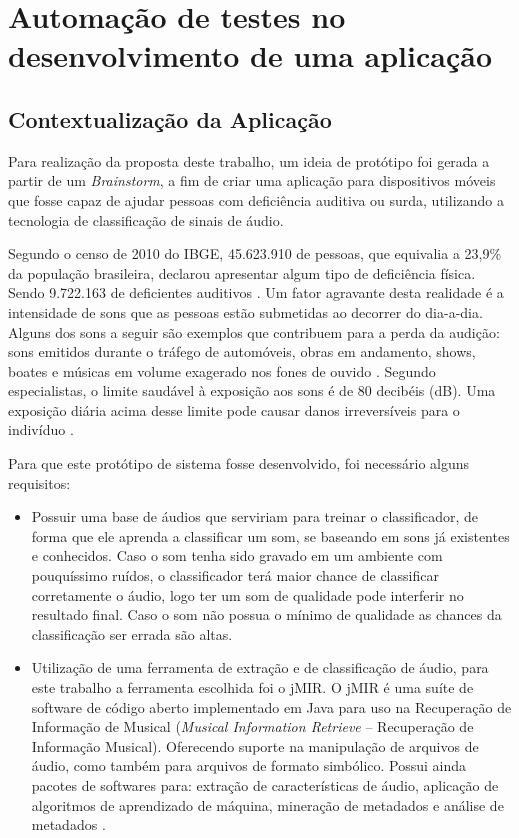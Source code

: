 \chapter{Automação de testes no desenvolvimento de uma aplicação}

\section{Contextualização da Aplicação}
Para realização da proposta deste trabalho, um ideia de protótipo foi gerada a partir de um \textit{Brainstorm}, a fim de criar uma aplicação para dispositivos móveis que fosse capaz de ajudar pessoas com deficiência auditiva ou surda, utilizando a tecnologia de classificação de sinais de áudio.

Segundo  o censo de 2010 do IBGE, 45.623.910 de pessoas, que equivalia a 23,9\% da população brasileira, declarou apresentar algum tipo de deficiência física. Sendo 9.722.163 de deficientes auditivos \cite{censo2010}. Um fator agravante desta realidade é a intensidade de sons que as pessoas estão submetidas ao decorrer do dia-a-dia. Alguns dos sons a seguir são exemplos que contribuem para a perda da audição: sons emitidos durante o tráfego de automóveis, obras em andamento, shows, boates e músicas em volume exagerado nos fones de ouvido \cite{jornalDiaDia}. Segundo especialistas, o limite saudável à exposição aos sons é de 80 decibéis (dB). Uma exposição diária acima desse limite pode causar danos irreversíveis para o indivíduo \cite{ruido}.

Para que este protótipo de sistema fosse desenvolvido, foi necessário alguns requisitos: 
\begin{itemize}
	\item Possuir uma base de áudios que serviriam para treinar o classificador, de forma que ele aprenda a classificar um som, se baseando em sons já existentes e conhecidos. Caso o som tenha sido gravado em um ambiente com pouquíssimo ruídos, o classificador terá maior chance de classificar corretamente o áudio, logo ter um som de qualidade pode interferir no resultado final. Caso o som não possua o mínimo de qualidade as chances da classificação ser errada são altas. 

	\item Utilização de uma ferramenta de extração e de classificação de áudio, para este trabalho a ferramenta escolhida foi o jMIR. O jMIR é uma suíte de software de código aberto implementado em Java para uso na Recuperação de Informação de Musical (\textit{Musical Information Retrieve} – Recuperação de Informação Musical). Oferecendo suporte  na manipulação de arquivos de áudio, como também para arquivos de formato simbólico. Possui ainda pacotes de softwares para: extração de características de áudio, aplicação de algoritmos de aprendizado de máquina, mineração de metadados e análise de metadados \cite{jmir}. 
\end{itemize}

